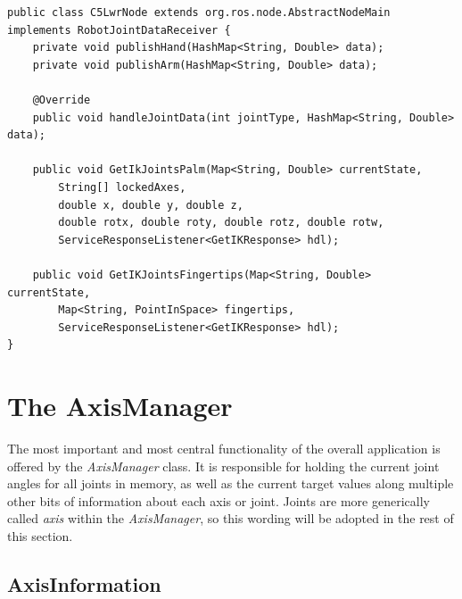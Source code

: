 \begin{lstlisting}[caption={C5LwrNode interface},label=lst:impl:c5lwrik]
public class C5LwrNode extends org.ros.node.AbstractNodeMain implements RobotJointDataReceiver {
	private void publishHand(HashMap<String, Double> data);
	private void publishArm(HashMap<String, Double> data);
	
	@Override
	public void handleJointData(int jointType, HashMap<String, Double> data);
	
	public void GetIkJointsPalm(Map<String, Double> currentState, 
		String[] lockedAxes, 
		double x, double y, double z, 
		double rotx, double roty, double rotz, double rotw,
		ServiceResponseListener<GetIKResponse> hdl);
	
	public void GetIKJointsFingertips(Map<String, Double> currentState,
		Map<String, PointInSpace> fingertips, 
		ServiceResponseListener<GetIKResponse> hdl);
}

\end{lstlisting}

\section{The AxisManager}

The most important and most central functionality of the overall application is offered by the \textit{AxisManager} class. It is responsible for holding the current joint angles for all joints in memory, as well as the current target values along multiple other bits of information about each axis or joint. Joints are more generically called \textit{axis} within the \textit{AxisManager}, so this wording will be adopted in the rest of this section.

\subsection{AxisInformation}

